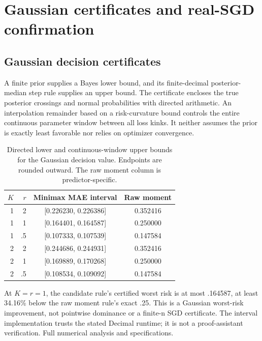 \section{Gaussian certificates and real-SGD confirmation}\label{gaussian-certificates-and-real-sgd-confirmation}

\subsection{Gaussian decision certificates}\label{gaussian-decision-certificates}

A finite prior supplies a Bayes lower bound, and its finite-decimal posterior-median step rule supplies an upper bound. The certificate encloses the true posterior crossings and normal probabilities with directed arithmetic. An interpolation remainder based on a risk-curvature bound controls the entire continuous parameter window between all loss kinks. It neither assumes the prior is exactly least favorable nor relies on optimizer convergence.

{\def\LTcaptype{none} %
\begin{table}[t]
\centering\small
\begin{tabular}{rrcc}
\toprule
$K$ & $r$ & Minimax MAE interval & Raw moment \\
\midrule
1 & 2 & [0.226230, 0.226386] & 0.352416 \\
1 & 1 & [0.164401, 0.164587] & 0.250000 \\
1 & .5 & [0.107333, 0.107539] & 0.147584 \\
2 & 2 & [0.244686, 0.244931] & 0.352416 \\
2 & 1 & [0.169889, 0.170268] & 0.250000 \\
2 & .5 & [0.108534, 0.109092] & 0.147584 \\
\bottomrule
\end{tabular}
\caption{Directed lower and continuous-window upper bounds for the Gaussian decision value. Endpoints are rounded outward. The raw moment column is predictor-specific.}\label{tab:certificates}
\end{table}
}

At \(K=r=1\), the candidate rule's certified worst risk is at most .164587, at least 34.16\% below the raw moment rule's exact .25. This is a Gaussian worst-risk improvement, not pointwise dominance or a finite-n SGD certificate. The interval implementation trusts the stated Decimal runtime; it is not a proof-assistant verification. Full numerical analysis and specifications.

